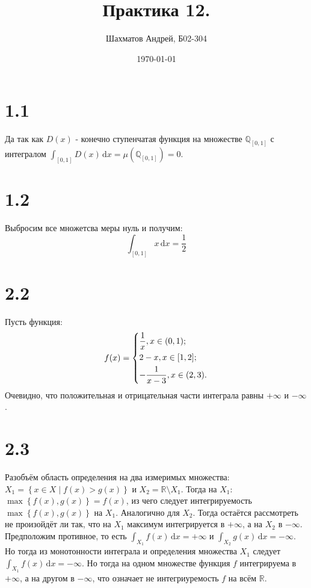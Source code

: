 \documentclass[12pt]{article}
\title{Практика 12.}
\author{Шахматов Андрей, Б02-304}
\date{\today}
\begin{document}
\maketitle
\tableofcontents

\section{1.1}
Да так как $D(x)$ - конечно ступенчатая функция на множестве $\mathbb{Q}_{[0,1]}$ с интегралом 
$\int_{[0, 1]} D(x) \,\mathrm{d}x = \mu(\mathbb{Q}_{[0, 1]}) = 0$. 
\section{1.2}
Выбросим все множетсва меры нуль и получим: 
\[
    \int_{[0, 1]} x \,\mathrm{d}x = \frac{1}{2} 
\] 
\section{2.2}
Пусть функция: 
\[
    f(x) = \begin{dcases}
        \frac{1}{x}, x \in (0, 1);\\
        2 - x, x \in [1, 2];\\
        - \frac{1}{x - 3}, x \in (2, 3).
    \end{dcases}
\]
Очевидно, что положительная и отрицательная части интеграла равны $+\infty$ и $-\infty$.  
\section{2.3}
Разобъём область определения на два измеримых множества: $X_1 = \left\{ x \in X \mid f(x) > g(x) \right\}$ и 
$X_2 = \mathbb{R} \setminus X_1$. Тогда на $X_1$: $\max \left\{ f(x), g(x) \right\} = f(x)$, 
из чего следует интегрируемость $\max \left\{ f(x), g(x) \right\}$ на $X_1$. Аналогично для $X_2$. 
Тогда остаётся рассмотреть не произойдёт ли так, что на $X_1$ максимум интегрируется в $+\infty$, 
а на $X_2$ в $-\infty$. Предположим противное, то есть $\int_{X_1} f(x) \,\mathrm{d}x = +\infty$ 
и $\int_{X_2} g(x) \,\mathrm{d}x = -\infty$. Но тогда из монотонности интеграла и определения
множества $X_1$ следует $\int_{X_1} f(x) \,\mathrm{d}x = -\infty$. Но тогда на одном множестве 
функция $f$ интегрируема в $+\infty$, а на другом в $-\infty$, что означает не интегриуремость 
$f$ на всём $\mathbb{R}$.             
\end{document}
